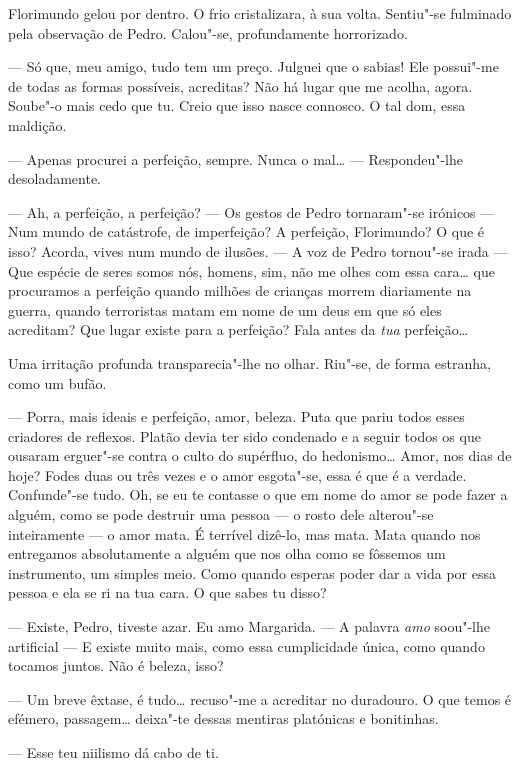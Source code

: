 Florimundo gelou por dentro. O frio cristalizara, à sua volta. Sentiu"-se
fulminado pela observação de Pedro. Calou"-se, profundamente horrorizado.

--- Só que, meu amigo, tudo tem um preço. Julguei que o sabias! Ele
possui"-me de todas as formas possíveis, acreditas? Não há lugar que me
acolha, agora. Soube"-o mais cedo que tu. Creio que isso nasce connosco.
O tal dom, essa maldição.

--- Apenas procurei a perfeição, sempre. Nunca o mal\ldots{} --- Respondeu"-lhe
desoladamente.

--- Ah, a perfeição, a perfeição? --- Os gestos de Pedro tornaram"-se
irónicos --- Num mundo de catástrofe, de imperfeição? A perfeição,
Florimundo? O que é isso? Acorda, vives num mundo de ilusões. --- A voz de
Pedro tornou"-se irada --- Que espécie de seres somos nós, homens, sim, não
me olhes com essa cara\ldots{} que procuramos a perfeição quando milhões de
crianças morrem diariamente na guerra, quando terroristas matam em nome
de um deus em que só eles acreditam? Que lugar existe para a perfeição?
Fala antes da \emph{tua} perfeição\ldots{}

Uma irritação profunda transparecia"-lhe no olhar. Riu"-se, de forma
estranha, como um bufão.

--- Porra, mais ideais e perfeição, amor, beleza. Puta que pariu todos
esses criadores de reflexos. Platão devia ter sido condenado e a seguir
todos os que ousaram erguer"-se contra o culto do supérfluo, do
hedonismo\ldots{} Amor, nos dias de hoje? Fodes duas ou três vezes e o amor
esgota"-se, essa é que é a verdade. Confunde"-se tudo. Oh, se eu te
contasse o que em nome do amor se pode fazer a alguém, como se pode
destruir uma pessoa --- o rosto dele alterou"-se inteiramente --- o amor
mata. É terrível dizê-lo, mas mata. Mata quando nos entregamos
absolutamente a alguém que nos olha como se fôssemos um instrumento, um
simples meio. Como quando esperas poder dar a vida por essa pessoa e ela
se ri na tua cara. O que sabes tu disso?

--- Existe, Pedro, tiveste azar. Eu amo Margarida. ---  A palavra \emph{amo}
soou"-lhe artificial --- E existe muito mais, como essa cumplicidade única,
como quando tocamos juntos. Não é beleza, isso?

--- Um breve êxtase, é tudo\ldots{} recuso"-me a acreditar no duradouro. O que
temos é efémero, passagem\ldots{} deixa"-te dessas mentiras platónicas e
bonitinhas.

--- Esse teu niilismo dá cabo de ti.

